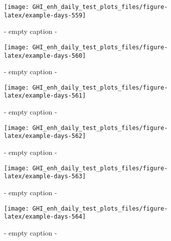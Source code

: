 \documentclass[
  10pt,
  a4paper,oneside]{article}
\begin{document}
\begin{figure}[H]

{\centering \texttt{[image: GHI\_enh\_daily\_test\_plots\_files/figure-latex/example-days-559]} 

}

\caption{ - empty caption - }\label{fig:example-days-559}
\end{figure}

\begin{figure}[H]

{\centering \texttt{[image: GHI\_enh\_daily\_test\_plots\_files/figure-latex/example-days-560]} 

}

\caption{ - empty caption - }\label{fig:example-days-560}
\end{figure}

\begin{figure}[H]

{\centering \texttt{[image: GHI\_enh\_daily\_test\_plots\_files/figure-latex/example-days-561]} 

}

\caption{ - empty caption - }\label{fig:example-days-561}
\end{figure}

\begin{figure}[H]

{\centering \texttt{[image: GHI\_enh\_daily\_test\_plots\_files/figure-latex/example-days-562]} 

}

\caption{ - empty caption - }\label{fig:example-days-562}
\end{figure}

\begin{figure}[H]

{\centering \texttt{[image: GHI\_enh\_daily\_test\_plots\_files/figure-latex/example-days-563]} 

}

\caption{ - empty caption - }\label{fig:example-days-563}
\end{figure}

\begin{figure}[H]

{\centering \texttt{[image: GHI\_enh\_daily\_test\_plots\_files/figure-latex/example-days-564]} 

}

\caption{ - empty caption - }\label{fig:example-days-564}
\end{figure}
\end{document}
